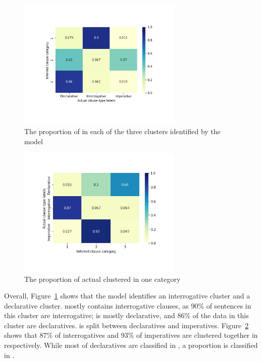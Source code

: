 \begin{figure}[H]
    \centering
    \includegraphics[width=0.7\textwidth]{figures/baseline-heatmap.jpg}
    \caption{The proportion of \diis{} in each of the three clusters identified by the \dlearnerabbr{} model}
    \label{fig:baseline-heatmap}
\end{figure}


\begin{figure}[H]
    \centering
    \includegraphics[width=0.7\textwidth]{figures/baseline-heatrev.jpg}
    \caption{The proportion of actual \diis{} clustered in one category}
    \label{fig:baseline-heatrev}
\end{figure}


Overall, Figure~\ref{fig:baseline-heatmap} shows that the \dlearnerabbr{} model identifies an interrogative cluster and a declarative cluster.  mostly contains interrogative clauses, as 90\% of sentences in this cluster are interrogative;  is mostly declarative, and 86\% of the data in this cluster are declaratives. is split between declaratives and imperatives. Figure~\ref{fig:baseline-heatrev} shows that 87\% of interrogatives and 93\% of imperatives are clustered together in respectively. While most of declaratives are classified in , a proportion is classified in .

